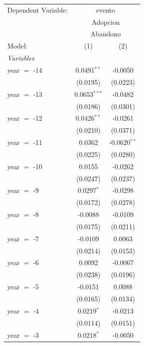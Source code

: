 
\begingroup
\centering
\begin{tabular}{lcc}
   \tabularnewline \midrule \midrule
   Dependent Variable: & \multicolumn{2}{c}{evento}\\
    & \multicolumn{2}{c}{Adopcion} \\ 
    & \multicolumn{2}{c}{Abandono} \\ 
   Model:          & (1)             & (2)\\  
   \midrule
   \emph{Variables}\\
   year $=$ -14    & 0.0491$^{**}$   & -0.0050\\   
                   & (0.0195)        & (0.0223)\\   
   year $=$ -13    & 0.0653$^{***}$  & -0.0482\\   
                   & (0.0186)        & (0.0301)\\   
   year $=$ -12    & 0.0426$^{**}$   & -0.0261\\   
                   & (0.0210)        & (0.0371)\\   
   year $=$ -11    & 0.0362          & -0.0620$^{**}$\\   
                   & (0.0225)        & (0.0280)\\   
   year $=$ -10    & 0.0155          & -0.0262\\   
                   & (0.0247)        & (0.0237)\\   
   year $=$ -9     & 0.0297$^{*}$    & -0.0298\\   
                   & (0.0172)        & (0.0278)\\   
   year $=$ -8     & -0.0088         & -0.0109\\   
                   & (0.0175)        & (0.0211)\\   
   year $=$ -7     & -0.0109         & 0.0063\\   
                   & (0.0214)        & (0.0153)\\   
   year $=$ -6     & 0.0092          & -0.0067\\   
                   & (0.0238)        & (0.0196)\\   
   year $=$ -5     & -0.0151         & 0.0088\\   
                   & (0.0165)        & (0.0134)\\   
   year $=$ -4     & 0.0219$^{*}$    & -0.0213\\   
                   & (0.0114)        & (0.0151)\\   
   year $=$ -3     & 0.0218$^{*}$    & -0.0050\\   

\end{tabular}
